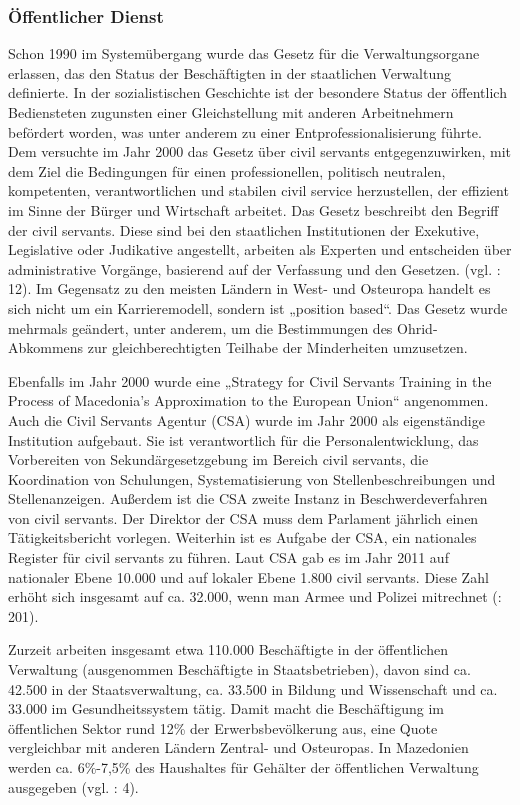 \subsubsection{Öffentlicher Dienst}
Schon 1990 im Systemübergang wurde das Gesetz für die Verwaltungsorgane erlassen, das den Status der Beschäftigten in der staatlichen Verwaltung definierte. In der sozialistischen Geschichte ist der besondere Status der öffentlich Bediensteten zugunsten einer Gleichstellung mit anderen Arbeitnehmern befördert worden, was unter anderem zu einer Entprofessionalisierung führte. Dem versuchte im Jahr 2000 das Gesetz über civil servants entgegenzuwirken, mit dem Ziel die Bedingungen für einen professionellen, politisch neutralen, kompetenten, verantwortlichen und stabilen civil service herzustellen, der effizient im Sinne der Bürger und Wirtschaft arbeitet. Das Gesetz beschreibt den Begriff der civil servants. Diese sind bei den staatlichen Institutionen der Exekutive, Legislative oder Judikative angestellt, arbeiten als Experten und entscheiden über administrative Vorgänge, basierend auf der Verfassung und den Gesetzen. (vgl. \cite{markic}: 12). Im Gegensatz zu den meisten Ländern in West- und Osteuropa handelt es sich nicht um ein Karrieremodell, sondern ist „position based“. Das Gesetz wurde mehrmals geändert, unter anderem, um die Bestimmungen des Ohrid-Abkommens zur gleichberechtigten Teilhabe der Minderheiten umzusetzen. \par
Ebenfalls im Jahr 2000 wurde eine  „Strategy for Civil Servants Training in the Process of Macedonia's Approximation to the European Union“ angenommen. Auch die Civil Servants Agentur (CSA) wurde im Jahr 2000 als eigenständige Institution aufgebaut. Sie ist verantwortlich für die Personalentwicklung, das Vorbereiten von Sekundärgesetzgebung im Bereich civil servants, die Koordination von Schulungen, Systematisierung von Stellenbeschreibungen und Stellenanzeigen. Außerdem ist die CSA zweite Instanz in Beschwerdeverfahren von civil servants. Der Direktor der CSA muss dem Parlament jährlich einen Tätigkeitsbericht vorlegen. Weiterhin ist es Aufgabe der CSA, ein nationales Register für civil servants zu führen. Laut CSA gab es im Jahr 2011 auf nationaler Ebene 10.000 und auf lokaler Ebene 1.800 civil servants. Diese Zahl erhöht sich insgesamt auf ca. 32.000, wenn man Armee und Polizei mitrechnet (\cite{repofmac04}: 201). \par
Zurzeit arbeiten insgesamt etwa 110.000 Beschäftigte in der öffentlichen Verwaltung (ausgenommen Beschäftigte in Staatsbetrieben), davon sind ca. 42.500 in der Staatsverwaltung, ca. 33.500 in Bildung und Wissenschaft und ca. 33.000 im Gesundheitssystem tätig. Damit macht die Beschäftigung im öffentlichen Sektor rund 12\% der Erwerbsbevölkerung aus, eine Quote vergleichbar mit anderen Ländern Zentral- und Osteuropas. In Mazedonien werden ca. 6\%-7,5\% des Haushaltes für Gehälter der öffentlichen Verwaltung ausgegeben (vgl. \cite{analyt09}: 4).\par
